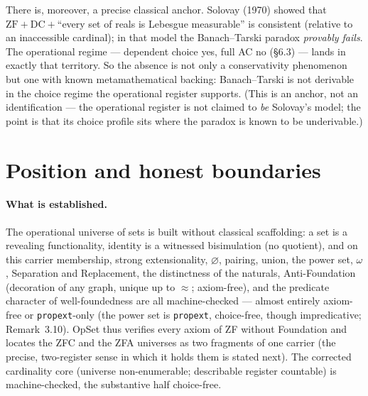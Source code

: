 \documentclass[11pt]{article}
\theoremstyle{remark}
\newcommand{\OpSet}{\textsf{OpSet}}
\newcommand{\eq}{\approx}
\begin{document}
There is, moreover, a precise classical anchor. Solovay (1970) showed that
$\mathrm{ZF}+\mathrm{DC}+$``every set of reals is Lebesgue measurable'' is consistent (relative to an
inaccessible cardinal); in that model the Banach--Tarski paradox \emph{provably fails}. The
operational regime --- dependent choice yes, full AC no (\S6.3) --- lands in exactly that territory.
So the absence is not only a conservativity phenomenon but one with known metamathematical backing:
Banach--Tarski is not derivable in the choice regime the operational register supports. (This is an
anchor, not an identification --- the operational register is not claimed to \emph{be} Solovay's
model; the point is that its choice profile sits where the paradox is known to be underivable.)

\section{Position and honest boundaries}\label{sec:position}
\paragraph{What is established.} The operational universe of sets is built without classical
scaffolding: a set is a revealing functionality, identity is a witnessed bisimulation (no quotient),
and on this carrier membership, strong extensionality, $\varnothing$, pairing, union, the power set,
$\omega$, Separation and Replacement, the distinctness of the naturals, Anti-Foundation (decoration of
any graph, unique up to $\eq$; axiom-free), and the predicate character of
well-foundedness are all machine-checked --- almost entirely axiom-free or \texttt{propext}-only (the
power set is \texttt{propext}, choice-free, though impredicative; Remark~3.10). \OpSet{} thus verifies
every axiom of ZF without Foundation and locates the ZFC and the ZFA universes as two fragments of one
carrier (the precise, two-register sense in which it holds them is stated next). The
corrected cardinality core (universe non-enumerable; describable register countable) is
machine-checked, the substantive half choice-free.
\end{document}
